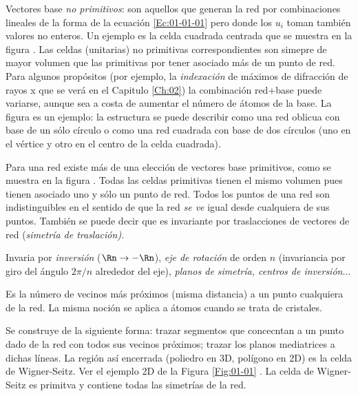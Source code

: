\begin{definition}
    Vectores base {\it no primitivos}: son aquellos que generan la red por combinaciones lineales de la forma de la ecuación \ref{Ec:01-01-01} pero donde los $u_i$ toman también valores no enteros. Un ejemplo es la celda cuadrada centrada que se muestra en la figura . Las celdas (unitarias) no primitivas correspondientes son simepre de mayor volumen que las primitivas por tener asociado más de un punto de red. Para algunos propósitos (por ejemplo, la {\it indexación} de máximos de difracción de rayos x que se verá en el Capitulo \ref{Ch:02}) la combinación red+base puede variarse, aunque sea a costa de aumentar el número de átomos de la base. La figura es un ejemplo: la estructura se puede describir como una red oblicua con base de un sólo círculo o como una red cuadrada con base de dos círculos (uno en el vértice y otro en el centro de la celda cuadrada).
\end{definition}

\begin{definition}
    Para una red existe más de una elección de vectores base primitivos, como se muestra en la figura . Todas las celdas primitivas tienen el mismo volumen pues tienen asociado uno y sólo un punto de red. Todos los puntos de una red son indistinguibles en el sentido de que la red {\it se ve} igual desde cualquiera de sus puntos. También se puede decir que es invariante por traslacciones de vectores de red (\it{simetría de traslación}).          
\end{definition}

\begin{definition}
    Invaria por {\it inversión} ($\Rn \rightarrow - \Rn$), {\it eje de rotación} de orden $n$ (invariancia por giro del ángulo $2\pi/n$ alrededor del eje), {\it planos de simetría, centros de inversión}...    
\end{definition}

\begin{definition}
    Es la número de vecinos más próximos (misma distancia) a un punto cualquiera de la red. La misma noción se aplica a átomos cuando se trata de cristales.
\end{definition}

\begin{definition}
    Se construye de la siguiente forma: trazar segmentos que concecntan a un punto dado de la red con todos sus vecinos próximos; trazar los planos mediatrices a dichas líneas. La región así encerrada (poliedro en 3D, polígono en 2D) es la celda de Wigner-Seitz. Ver el ejemplo 2D de la Figura \ref{Fig:01-01} . La celda de Wigner-Seitz es primitva y contiene todas las simetrías de la red.    
\end{definition}

